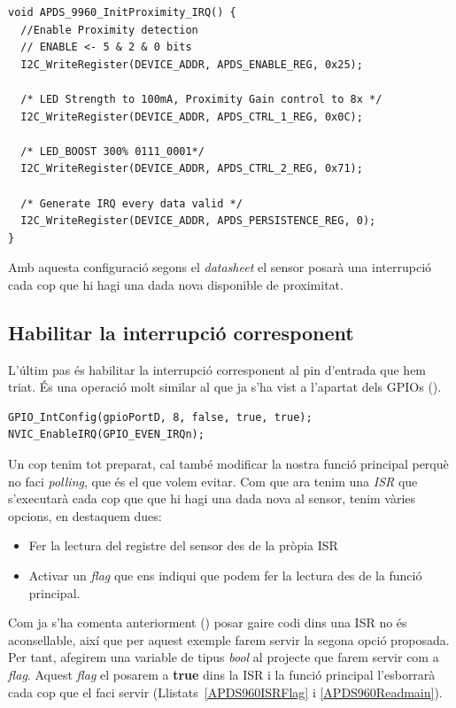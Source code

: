 \begin{lstlisting}[caption={Nova funció d'initialització del APDS{\_}9960},style=customc,label=APDS960InitProximityIRQ]
void APDS_9960_InitProximity_IRQ() {
  //Enable Proximity detection
  // ENABLE <- 5 & 2 & 0 bits
  I2C_WriteRegister(DEVICE_ADDR, APDS_ENABLE_REG, 0x25);

  /* LED Strength to 100mA, Proximity Gain control to 8x */
  I2C_WriteRegister(DEVICE_ADDR, APDS_CTRL_1_REG, 0x0C);

  /* LED_BOOST 300% 0111_0001*/
  I2C_WriteRegister(DEVICE_ADDR, APDS_CTRL_2_REG, 0x71);

  /* Generate IRQ every data valid */
  I2C_WriteRegister(DEVICE_ADDR, APDS_PERSISTENCE_REG, 0);
}
\end{lstlisting}

Amb aquesta configuració segons el {\em datasheet} el sensor posarà una interrupció cada cop que hi hagi una dada nova disponible de proximitat.

\subsection{Habilitar la interrupció corresponent}
L'últim pas és habilitar la interrupció corresponent al pin d'entrada que hem triat. És una operació molt similar al que ja s'ha vist a l'apartat dels GPIOs ().

\begin{lstlisting}[caption={Habilitar l'interrupció del pin corresponent},style=customc,label=APDS960EnableIRQ]
GPIO_IntConfig(gpioPortD, 8, false, true, true);
NVIC_EnableIRQ(GPIO_EVEN_IRQn);
\end{lstlisting}

Un cop tenim tot preparat, cal també modificar la nostra funció principal perquè no faci {\em polling}, que és el que volem evitar. Com que ara tenim una {\em ISR} que s'executarà cada cop que que hi hagi una dada nova al sensor, tenim vàries opcions, en destaquem dues:
\begin{itemize}
 \item Fer la lectura del registre del sensor des de la pròpia \gls{ISR}
 \item Activar un {\em flag} que ens indiqui que podem fer la lectura des de la funció principal.
\end{itemize}

Com ja s'ha comenta anteriorment () posar gaire codi dins una \gls{ISR} no és aconsellable, així que per aquest exemple farem servir la segona opció proposada. Per tant, afegirem una variable de tipus {\em bool} al projecte que farem servir com a {\em flag}. Aquest {\em flag} el posarem a {\bf true} dins la \gls{ISR} i la funció principal l'esborrarà cada cop que el faci servir (Llistats~\ref{APDS960ISRFlag} i \ref{APDS960Readmain}).

